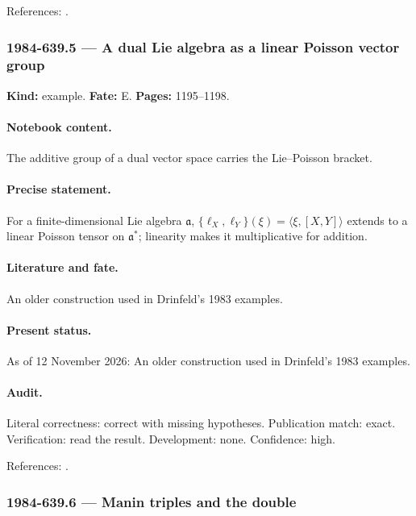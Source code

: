 \noindent References: \citep{drinfeld1983hamiltonian}.\par

\subsubsection{1984-639.5 --- A dual Lie algebra as a linear Poisson vector group}

\label{item:1984-639.5}

\noindent\textbf{Kind:} example. \textbf{Fate:} E. \textbf{Pages:} 1195--1198.\par

\paragraph{Notebook content.} The additive group of a dual vector space carries the Lie--Poisson bracket.

\paragraph{Precise statement.} For a finite-dimensional Lie algebra \(\mathfrak a\), \(\{\ell_X,\ell_Y\}(\xi)=\langle\xi,[X,Y]\rangle\) extends to a linear Poisson tensor on \(\mathfrak a^*\); linearity makes it multiplicative for addition.

\paragraph{Literature and fate.} An older construction used in Drinfeld's 1983 examples.

\paragraph{Present status.} As of 12 November 2026: An older construction used in Drinfeld's 1983 examples.

\paragraph{Audit.} Literal correctness: correct with missing hypotheses. Publication match: exact. Verification: read the result. Development: none. Confidence: high.

\noindent References: \citep{drinfeld1983hamiltonian}.\par

\subsubsection{1984-639.6 --- Manin triples and the double}

